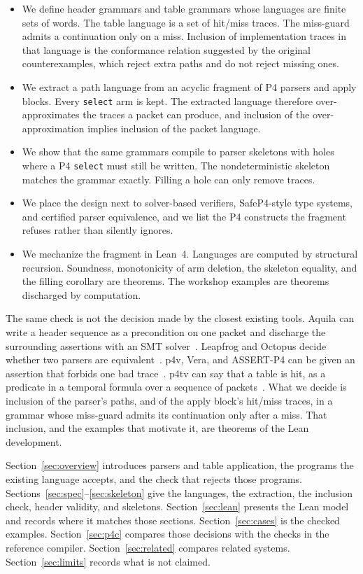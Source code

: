 \documentclass[a4paper,UKenglish,cleveref,autoref]{lipics-v2021}
\begin{document}
\begin{itemize}
\item We define header grammars and table grammars whose languages are finite sets of words.
  The table language is a set of hit/miss traces.
  The miss-guard admits a continuation only on a miss.
  Inclusion of implementation traces in that language is the conformance relation suggested by the original counterexamples, which reject extra paths and do not reject missing ones.
\item We extract a path language from an acyclic fragment of P4 parsers and apply blocks.
  Every \texttt{select} arm is kept.
  The extracted language therefore over-approximates the traces a packet can produce, and inclusion of the over-approximation implies inclusion of the packet language.
\item We show that the same grammars compile to parser skeletons with holes where a P4 \texttt{select} must still be written.
  The nondeterministic skeleton matches the grammar exactly.
  Filling a hole can only remove traces.
\item We place the design next to solver-based verifiers, SafeP4-style type systems, and certified parser equivalence, and we list the P4 constructs the fragment refuses rather than silently ignores.
\item We mechanize the fragment in Lean~4.
  Languages are computed by structural recursion.
  Soundness, monotonicity of arm deletion, the skeleton equality, and the filling corollary are theorems.
  The workshop examples are theorems discharged by computation.
\end{itemize}

The same check is not the decision made by the closest existing tools.
Aquila can write a header sequence as a precondition on one packet and discharge the surrounding assertions with an SMT solver~\cite{aquila}.
Leapfrog and Octopus decide whether two parsers are equivalent~\cite{leapfrog,octopus}.
p4v, Vera, and ASSERT-P4 can be given an assertion that forbids one bad trace~\cite{p4v,vera,assertp4}.
p4tv can say that a table is hit, as a predicate in a temporal formula over a sequence of packets~\cite{p4ltl}.
What we decide is inclusion of the parser's paths, and of the apply block's hit/miss traces, in a grammar whose miss-guard admits its continuation only after a miss.
That inclusion, and the examples that motivate it, are theorems of the Lean development.

Section~\ref{sec:overview} introduces parsers and table application, the programs the existing language accepts, and the check that rejects those programs.
Sections~\ref{sec:spec}--\ref{sec:skeleton} give the languages, the extraction, the inclusion check, header validity, and skeletons.
Section~\ref{sec:lean} presents the Lean model and records where it matches those sections.
Section~\ref{sec:cases} is the checked examples.
Section~\ref{sec:p4c} compares those decisions with the checks in the reference compiler.
Section~\ref{sec:related} compares related systems.
Section~\ref{sec:limits} records what is not claimed.
\end{document}
